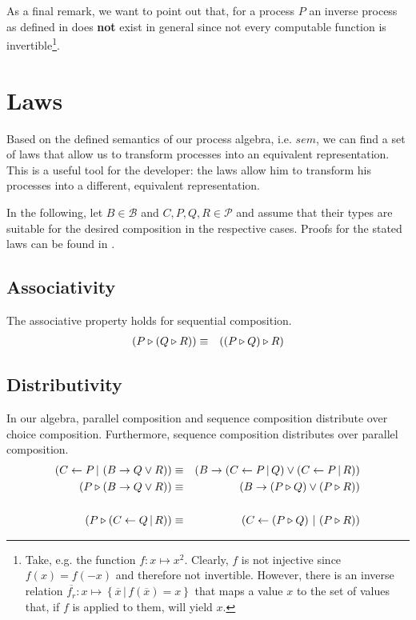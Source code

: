 

As a final remark, we want to point out that, for a process $P$ an inverse process as defined in  does \textbf{not} exist in general since not every computable function is invertible\footnote{Take, e.g. the function $f \colon x \mapsto x^2$. Clearly, $f$ is not injective since $f \left( x \right) = f \left( -x \right)$ and therefore not invertible. However, there is an inverse relation $\overline{f_r} \colon x \mapsto \left\{ \overline{x} \,|\, f \left( \overline{x} \right) = x \right\}$ that maps a value $x$ to the set of values that, if $f$ is applied to them, will yield $x$.}.






\section{Laws}
\label{chp:laws}
Based on the defined semantics of our process algebra, i.e. $sem$, we can find a set of laws that allow us to transform processes into an equivalent representation. This is a useful tool for the developer: the laws allow him to transform his processes into a different, equivalent representation.

In the following, let $B \in \mathcal{B}$ and $C, P, Q, R \in \mathcal{P}$ and assume that their types are suitable for the desired composition in the respective cases. Proofs for the stated laws can be found in .

\subsection{Associativity}
The associative property holds for sequential composition.
\begin{eqnarray*}
  \left( P \triangleright \left( Q \triangleright R \right) \right) & \equiv & \left( \left( P \triangleright Q \right) \triangleright R \right)
\end{eqnarray*}

\subsection{Distributivity}
In our algebra, parallel composition and sequence composition distribute over choice composition. Furthermore, sequence composition distributes over parallel composition.
\begin{eqnarray*}
  \left( C \gets P \, | \, \left( B \to Q \vee R \right) \right) & \equiv & \left( B \to \left( C \gets P \, | \, Q \right) \vee \left( C \gets P \, | \, R \right) \right) \\
  \left( P \triangleright \left( B \to Q \vee R \right) \right) & \equiv & \left( B \to \left( P \triangleright Q \right) \vee \left( P \triangleright R \right) \right) \\
  & & \\
  \left( P \triangleright \left( C \gets Q \, | \, R \right) \right) & \equiv & \left( C \gets \left( P \triangleright Q \right) \, | \, \left( P \triangleright R \right) \right)
\end{eqnarray*}

